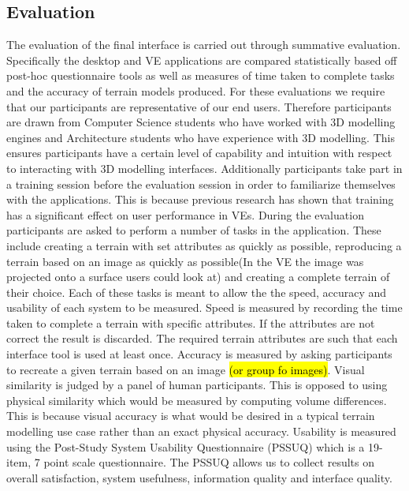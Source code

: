 \documentclass{article}
\begin{document}
\subsection{Evaluation}

The evaluation of the final interface is carried out through summative evaluation\cite{Bowman2002}. Specifically the desktop and VE applications are compared statistically based off post-hoc questionnaire tools as well as measures of time taken to complete tasks and the accuracy of terrain models produced.
\newline\newline
For these evaluations we require that our participants are representative of our end users\cite{Bowman2002}. Therefore participants are drawn from Computer Science students who have worked with 3D modelling engines and Architecture students who have experience with 3D modelling. This ensures participants have a certain level of capability and intuition with respect to interacting with 3D modelling interfaces. Additionally participants take part in a training session before the evaluation session in order to familiarize themselves with the applications.  This is because previous research has shown that training has a significant effect on user performance in VEs\cite{Schultheis2012}.
\newline\newline
During the evaluation participants are asked to perform a number of tasks in the application. These include creating a terrain with set attributes as quickly as possible, reproducing a terrain based on an image as quickly as possible(In the VE the image was projected onto a surface users could look at) and creating a complete terrain of their choice. Each of these tasks is meant to allow the the speed, accuracy and usability of each system to be measured.
\newline\newline
Speed is measured by recording the time taken to complete a terrain with specific attributes. If the attributes are not correct the result is discarded. The required terrain attributes are such that each interface tool is used at least once.
\newline\newline
Accuracy is measured by asking participants to recreate a given terrain based on an image \hl{(or group fo images)}. Visual similarity is judged by a panel of human participants. This is opposed to using physical similarity which would be measured by computing volume differences. This is because visual accuracy is what would be desired in a typical terrain modelling use case rather than an exact physical accuracy.
\newline\newline
Usability is measured using the Post-Study System Usability Questionnaire (PSSUQ) which is a 19-item, 7 point scale questionnaire\cite{Lewis1995}. The PSSUQ allows us to collect results on overall satisfaction, system usefulness, information quality and interface quality.


\end{document}
